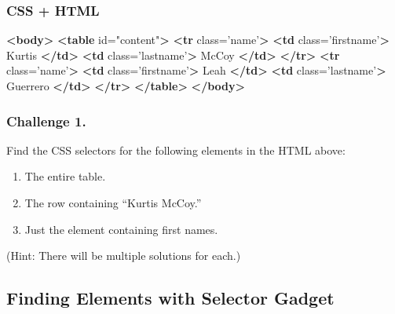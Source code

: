 \documentclass[
]{book}
\newenvironment{Shaded}{\begin{snugshade}}{\end{snugshade}}
\newcommand{\KeywordTok}[1]{\textcolor[rgb]{0.13,0.29,0.53}{\textbf{#1}}}
\newcommand{\NormalTok}[1]{#1}
\newcommand{\OtherTok}[1]{\textcolor[rgb]{0.56,0.35,0.01}{#1}}
\newcommand{\StringTok}[1]{\textcolor[rgb]{0.31,0.60,0.02}{#1}}
\providecommand{\tightlist}{%
  \setlength{\itemsep}{0pt}\setlength{\parskip}{0pt}}
\begin{document}
\hypertarget{css-html}{%
\subsubsection{CSS + HTML}\label{css-html}}

\begin{Shaded}
\begin{Highlighting}[]
\KeywordTok{<body>}
    \KeywordTok{<table}\OtherTok{ id=}\StringTok{"content"}\KeywordTok{>}
        \KeywordTok{<tr}\OtherTok{ class=}\StringTok{'name'}\KeywordTok{>}
            \KeywordTok{<td}\OtherTok{ class=}\StringTok{'firstname'}\KeywordTok{>}
\NormalTok{                Kurtis}
            \KeywordTok{</td>}
            \KeywordTok{<td}\OtherTok{ class=}\StringTok{'lastname'}\KeywordTok{>}
\NormalTok{                McCoy}
            \KeywordTok{</td>}
        \KeywordTok{</tr>}
        \KeywordTok{<tr}\OtherTok{ class=}\StringTok{'name'}\KeywordTok{>}
            \KeywordTok{<td}\OtherTok{ class=}\StringTok{'firstname'}\KeywordTok{>}
\NormalTok{                Leah}
            \KeywordTok{</td>}
            \KeywordTok{<td}\OtherTok{ class=}\StringTok{'lastname'}\KeywordTok{>}
\NormalTok{                Guerrero}
            \KeywordTok{</td>}
        \KeywordTok{</tr>}
    \KeywordTok{</table>}
\KeywordTok{</body>}
\end{Highlighting}
\end{Shaded}

\hypertarget{challenge-1.-15}{%
\subsubsection*{Challenge 1.}\label{challenge-1.-15}}

Find the CSS selectors for the following elements in the HTML above:

\begin{enumerate}
\def\labelenumi{\arabic{enumi}.}
\tightlist
\item
  The entire table.
\item
  The row containing ``Kurtis McCoy.''
\item
  Just the element containing first names.
\end{enumerate}

(Hint: There will be multiple solutions for each.)

\hypertarget{finding-elements-with-selector-gadget}{%
\subsection{Finding Elements with Selector Gadget}\label{finding-elements-with-selector-gadget}}
\end{document}
